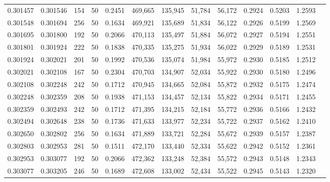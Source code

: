 \begin{tabular}{rrrrrrrrrrrrr}
0.301457 & 0.301546 &   154 &  50 &                                     0.2451 & 469,665 & 135,945 &  51,784 &  56,172 & 0.2924 & 0.5203 & 1.2593 \\
0.301548 & 0.301694 &   256 &  50 &                                     0.1634 & 469,921 & 135,689 &  51,834 &  56,122 & 0.2926 & 0.5199 & 1.2569 \\
0.301695 & 0.301800 &   192 &  50 &                                     0.2066 & 470,113 & 135,497 &  51,884 &  56,072 & 0.2927 & 0.5194 & 1.2551 \\
0.301801 & 0.301924 &   222 &  50 &                                     0.1838 & 470,335 & 135,275 &  51,934 &  56,022 & 0.2929 & 0.5189 & 1.2531 \\
0.301924 & 0.302021 &   201 &  50 &                                     0.1992 & 470,536 & 135,074 &  51,984 &  55,972 & 0.2930 & 0.5185 & 1.2512 \\
0.302021 & 0.302108 &   167 &  50 &                                     0.2304 & 470,703 & 134,907 &  52,034 &  55,922 & 0.2930 & 0.5180 & 1.2496 \\
0.302108 & 0.302248 &   242 &  50 &                                     0.1712 & 470,945 & 134,665 &  52,084 &  55,872 & 0.2932 & 0.5175 & 1.2474 \\
0.302248 & 0.302359 &   208 &  50 &                                     0.1938 & 471,153 & 134,457 &  52,134 &  55,822 & 0.2934 & 0.5171 & 1.2455 \\
0.302359 & 0.302493 &   242 &  50 &                                     0.1712 & 471,395 & 134,215 &  52,184 &  55,772 & 0.2936 & 0.5166 & 1.2432 \\
0.302494 & 0.302648 &   238 &  50 &                                     0.1736 & 471,633 & 133,977 &  52,234 &  55,722 & 0.2937 & 0.5162 & 1.2410 \\
0.302650 & 0.302802 &   256 &  50 &                                     0.1634 & 471,889 & 133,721 &  52,284 &  55,672 & 0.2939 & 0.5157 & 1.2387 \\
0.302803 & 0.302953 &   281 &  50 &                                     0.1511 & 472,170 & 133,440 &  52,334 &  55,622 & 0.2942 & 0.5152 & 1.2361 \\
0.302953 & 0.303077 &   192 &  50 &                                     0.2066 & 472,362 & 133,248 &  52,384 &  55,572 & 0.2943 & 0.5148 & 1.2343 \\
0.303077 & 0.303205 &   246 &  50 &                                     0.1689 & 472,608 & 133,002 &  52,434 &  55,522 & 0.2945 & 0.5143 & 1.2320 \\

\end{tabular}
